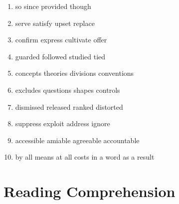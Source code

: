 \begin{enumerate}
\item


\fourchoices
{so}
{since}
{provided}
{though}




\item


\fourchoices
{serve}
{satisfy}
{upset}
{replace}




\item


\fourchoices
{confirm}
{express}
{cultivate}
{offer}




\item


\fourchoices
{guarded}
{followed}
{studied}
{tied}




\item


\fourchoices
{concepts}
{theories}
{divisions}
{conventions}




\item


\fourchoices
{excludes}
{questions}
{shapes}
{controls}




\item


\fourchoices
{dismissed}
{released}
{ranked}
{distorted}




\item


\fourchoices
{suppress}
{exploit}
{address}
{ignore}




\item


\fourchoices
{accessible}
{amiable}
{agreeable}
{accountable}




\item


\fourchoices
{by all means}
{at all costs}
{in a word}
{as a result}


\end{enumerate}


\vfil

\section{Reading Comprehension}


